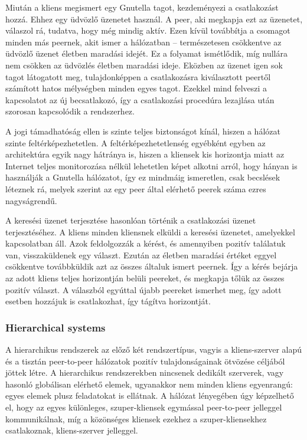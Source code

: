 \documentclass[a4paper]{article}
\begin{document}
Miután a kliens megismert egy Gnutella tagot, kezdeményezi a csatlakozást hozzá. Ehhez egy üdvözlő üzenetet használ. A peer, aki megkapja ezt az üzenetet, válaszol rá, tudatva, hogy még mindig aktív. Ezen kívül továbbítja a csomagot minden más peernek, akit ismer a hálózatban – természetesen csökkentve az üdvözlő üzenet életben maradási idejét. Ez a folyamat ismétlődik, míg nullára nem csökken az üdvözlés életben maradási ideje. Eközben az üzenet igen sok tagot látogatott meg, tulajdonképpen a csatlakozásra kiválasztott peertől számított hatos mélységben minden egyes tagot. Ezekkel mind felveszi a kapcsolatot az új becsatlakozó, így a csatlakozási procedúra lezajlása után szorosan kapcsolódik a rendszerhez.

A jogi támadhatóság ellen is szinte teljes biztonságot kínál, hiszen a hálózat szinte feltérképezhetetlen. A feltérképezhetetlenség egyébként egyben az architektúra egyik nagy hátránya is, hiszen a kliensek kis horizontja miatt az Internet teljes monitorozása nélkül lehetetlen képet alkotni arról, hogy hányan is használják a Gnutella hálózatot, így ez mindmáig ismeretlen, csak becslések léteznek rá, melyek szerint az egy peer által elérhető peerek száma ezres nagyságrendű.

A keresési üzenet terjesztése hasonlóan történik a csatlakozási üzenet terjesztéséhez. A kliens minden kliensnek elküldi a keresési üzenetet, amelyekkel kapcsolatban áll. Azok feldolgozzák a kérést, és amennyiben pozitív találatuk van, visszaküldenek egy választ. Ezután az életben maradási értéket eggyel csökkentve továbbküldik azt az összes általuk ismert peernek. Így a kérés bejárja az adott kliens teljes horizontján belüli peereket, és megkapja tőlük az összes pozitív választ. A válaszból egyúttal újabb peereket ismerhet meg, így adott esetben hozzájuk is csatlakozhat, így tágítva horizontját. 

\subsubsection{Hierarchical systems}

A hierarchikus rendszerek az előző két rendszertípus, vagyis a kliens-szerver alapú és a tisztán peer-to-peer hálózatok pozitív tulajdonságainak ötvözése céljából jöttek létre. A hierarchikus rendszerekben nincsenek dedikált szerverek, vagy hasonló globálisan elérhető elemek, ugyanakkor nem minden kliens egyenrangú: egyes elemek plusz feladatokat is ellátnak. A hálózat lényegében úgy képzelhető el, hogy az egyes különleges, szuper-kliensek egymással peer-to-peer jelleggel kommunikálnak, míg a közönséges kliensek ezekhez a szuper-kliensekhez csatlakoznak, kliens-szerver jelleggel.
\end{document}
